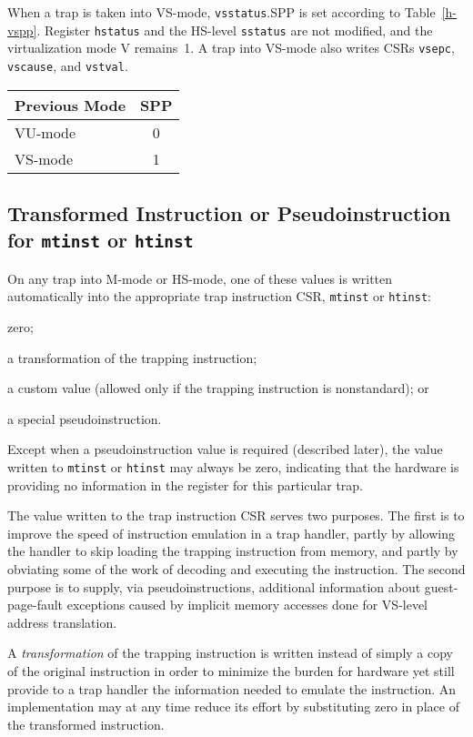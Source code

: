 When a trap is taken into VS-mode, {\tt vsstatus}.SPP is set according to
Table~\ref{h-vspp}.
Register {\tt hstatus} and the HS-level {\tt sstatus} are not modified,
and the virtualization mode V remains~1.
A trap into VS-mode also writes CSRs {\tt vsepc}, {\tt vscause}, and
{\tt vstval}.

\begin{table*}[h!]
\begin{center}
\begin{tabular}{|l|c|}
  \hline
  Previous Mode & SPP \\ \hline
  VU-mode       & 0   \\
  VS-mode       & 1   \\ \hline
\end{tabular}
\end{center}
\caption{Value of {\tt vsstatus} field SPP after a trap into VS-mode.}
\label{h-vspp}
\end{table*}

\FloatBarrier

\subsection{Transformed Instruction or Pseudoinstruction for {\tt mtinst} or {\tt htinst}}
\label{sec:tinst-vals}

On any trap into M-mode or HS-mode, one of these values is written
automatically into the appropriate trap instruction CSR, {\tt mtinst} or
{\tt htinst}:
\begin{tightlist}
\item
zero;
\item
a transformation of the trapping instruction;
\item
a custom value (allowed only if the trapping instruction is nonstandard);
or
\item
a special pseudoinstruction.
\end{tightlist}
Except when a pseudoinstruction value is required (described later), the
value written to {\tt mtinst} or {\tt htinst} may always be zero,
indicating that the hardware is providing no information in the register
for this particular trap.

\begin{commentary}
The value written to the trap instruction CSR serves two purposes.
The first is to improve the speed of instruction emulation in a trap
handler, partly by allowing the handler to skip loading the trapping
instruction from memory, and partly by obviating some of the work of
decoding and executing the instruction.
The second purpose is to supply, via pseudoinstructions, additional
information about guest-page-fault exceptions caused by implicit memory
accesses done for VS-level address translation.

A \emph{transformation} of the trapping instruction is written instead of
simply a copy of the original instruction in order to minimize the burden
for hardware yet still provide to a trap handler the information needed
to emulate the instruction.
An implementation may at any time reduce its effort by substituting zero
in place of the transformed instruction.
\end{commentary}

